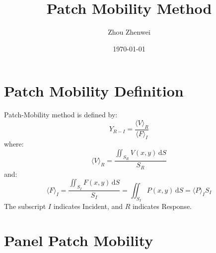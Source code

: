 \documentclass[a4paper,UTF8]{ctexart}
\title{Patch Mobility Method}
\author{Zhou Zhenwei}
\date{\today}
\begin{document}
	\maketitle
	\thispagestyle{empty}
	
	\section{Patch Mobility Definition}
	Patch-Mobility method is defined by:
	\begin{equation}
	\label{eq:PatchMobilityDefinition}
	Y_{R-I} = \frac{\langle V\rangle_R}{\langle F\rangle_I}
	\end{equation}
	where:
	\begin{equation}
	\label{eq:PatchMeanVelocity}
	\langle V\rangle_R = \frac{\iint_{S_R}V\left(x,y\right)\,\mathrm{d}S}{S_R}
	\end{equation}
	and:
	\begin{equation}
	\label{eq:PatchMeanForce}
	\langle F\rangle_I 
	= \frac{\iint_{S_I}F\left(x,y\right)\,\mathrm{d}S}{S_I} 
	= \iint_{S_I}P\left(x,y\right)\,\mathrm{d}S 
	= \langle P\rangle_IS_I
	\end{equation}
	The subscript $I$ indicates Incident, and $R$ indicates Response.
	
	
	\section{Panel Patch Mobility}
	
\end{document}
